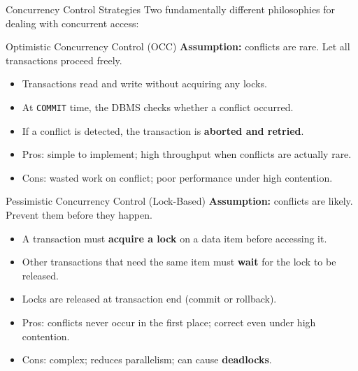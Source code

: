 \begin{frame}{Concurrency Control Strategies}
  Two fundamentally different philosophies for dealing with concurrent access:

  \medskip
  \begin{block}{Optimistic Concurrency Control (OCC)}
    \textbf{Assumption:} conflicts are rare. Let all transactions proceed freely.
    \begin{itemize}
      \item Transactions read and write without acquiring any locks.
      \item At \texttt{COMMIT} time, the DBMS checks whether a conflict occurred.
      \item If a conflict is detected, the transaction is \textbf{aborted and retried}.
      \item Pros: simple to implement; high throughput when conflicts are actually rare.
      \item Cons: wasted work on conflict; poor performance under high contention.
    \end{itemize}
  \end{block}

  \begin{block}{Pessimistic Concurrency Control (Lock-Based)}
    \textbf{Assumption:} conflicts are likely. Prevent them before they happen.
    \begin{itemize}
      \item A transaction must \textbf{acquire a lock} on a data item before accessing it.
      \item Other transactions that need the same item must \textbf{wait} for the lock to be
            released.
      \item Locks are released at transaction end (commit or rollback).
      \item Pros: conflicts never occur in the first place; correct even under high contention.
      \item Cons: complex; reduces parallelism; can cause \textbf{deadlocks}.
    \end{itemize}
  \end{block}
\end{frame}

